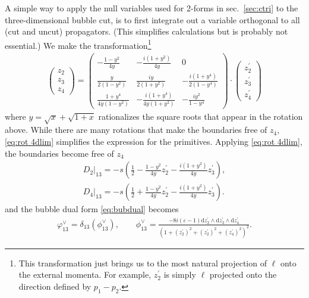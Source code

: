 \documentclass[11pt]{article}
\renewcommand{\sec}[1]{sec.~\ref{#1}}
\renewcommand{\d}{\text{d}}
\newcommand{\nn}{\nonumber}
\newcommand{\vphi}{\varphi}
\newcommand{\vep}{\varepsilon}
\begin{document}
A simple way to apply the null variables used for 2-forms in \sec{sec:ctri} to the three-dimensional bubble cut, is to first integrate out a variable orthogonal to all (cut and uncut) propagators. (This simplifies calculations but is probably not essential.)
We make the transformation\footnote{This transformation just brings us to the most natural projection of $\ell$ onto the external momenta. For example, $z_2^\prime$ is simply $\ell$ projected onto the direction defined by $p_1-p_2$. }
\begin{align} \label{eq:rot 4dlim}
	\begin{pmatrix}
		z_2
		\\
		z_3 
		\\ 
		z_4
	\end{pmatrix}
	=
	\begin{pmatrix}
		-\frac{1-y^2}{4y} 
		& -\frac{i(1+y^2)}{4y} 
		& 0 
		\\
		\frac{y}{2(1-y^2)}
		& \frac{iy}{2(1+y^2)}
		& -\frac{i(1+y^4)}{2(1-y^4)}
		\\
		\frac{1+y^4}{4y(1-y^2)}
		&-\frac{i(1+y^4)}{4y(1+y^2)}
		&-\frac{iy^2}{1-y^4}
	\end{pmatrix}
	\cdot 
	\begin{pmatrix}
		z_2^\prime
		\\
		z_3^\prime
		\\ 
		z_4^\prime
	\end{pmatrix}
\end{align}
where $y=\sqrt{x}+\sqrt{1+x}$ rationalizes the square roots that appear in the rotation above. 
While there are many rotations that make the boundaries free of $z_4$, \eqref{eq:rot 4dlim} simplifies the expression for the primitives. 
Applying \eqref{eq:rot 4dlim}, the boundaries become free of $z_4$
\begin{align}
	D_2\vert_{13} = -s \left( 
			\frac12 
			- \frac{1-y^2}{4y} z_2^\prime 
			- \frac{i(1+y^2)}{4y} z_3^\prime 
		\right),
	\nn\\
	D_4\vert_{13} = -s \left( 
			\frac12 
			+ \frac{1-y^2}{4y} z_2^\prime 
			- \frac{i(1+y^2)}{4y} z_3^\prime 
		\right).
\end{align}
and the bubble dual form \eqref{eq:bubdual} becomes
\begin{align} \label{eq:4d bubdual}
	\vphi^\vee_{13} = \delta_{13} (\phi^\vee_{13}),
	\qquad
	\phi^\vee_{13} = 
	\frac{ 
		-8i(\vep-1) 
		\d z_2^\prime \wedge \d z_3^\prime \wedge \d z_4^\prime
	}{
		(1 + (z_2^\prime)^2 + (z_2^\prime)^2 +  (z_4^\prime)^2 )^2
	}.
\end{align} 
\end{document}
